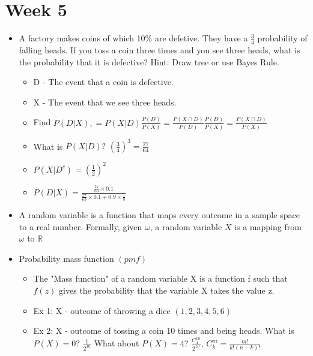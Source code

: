 \documentclass[12pt]{article}
\begin{document}
    \section{Week 5}
    \begin{itemize}
        \item A factory makes coins of which 10\% are defetive.
        They have a $\frac{3}{4}$ probability of falling heads.
        If you toss a coin three times and you see three heads, what is the probability that it is defective?
        Hint: Draw tree or use Bayes Rule.
        \begin{itemize}
            \item D - The event that a coin is defective.
            \item X - The event that we see three heads.
            \item Find $P(D|X), = P(X|D)\frac{P(D)}{P(X)} = \frac{P(X \cap D)}{P(D)} \frac{P(D)}{P(X)} = \frac{P(X \cap D)}{P(X)}$
            \item What is $P(X|D)? $ \guillemotright $(\frac{3}{4})^3 = \frac{27}{64}$
            \item $P(X|D^c) = (\frac{1}{2})^2$
            \item $P(D|X) = \frac{\frac{27}{63} \times 0.1}{\frac{27}{63} \times 0.1 + 0.9 \times \frac{1}{8}}$
        \end{itemize}
        \item A random variable is a function that maps every outcome in a sample space to a real number. Formally, given $\omega$,
        a random variable $X$ is a mapping from $\omega$ to $\mathbb{R}$
        \item Probability mass function $(pmf)$
        \begin{itemize}
            \item The "Mass function" of a random variable X is a function f such that $f(z)$ gives the
            probability that the variable X takes the value z.
            \item Ex 1: X - outcome of throwing a dice $(1,2,3,4,5,6)$
            \item Ex 2: X - outcome of tossing a coin 10 times and being heads. What is $P(X) = 0$? $\frac{1}{2^{10}}$ \newline
            What about $P(X) = 4$? \guillemotright $\frac{C_4^{10}}{2^{10}}$, $C_k^m=\frac{m!}{k!(n-k)!}$
        \end{itemize}
    \end{itemize}
\end{document}

